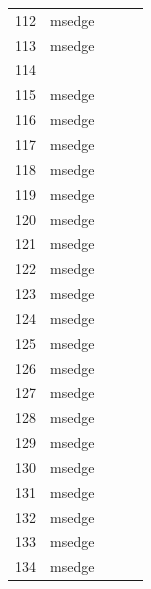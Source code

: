 \documentclass[a4paper,twoside,12pt]{book}
\begin{document}
\begin{appendices}
\begin{table}
\begin{tabular}{lllll}
	112 &         msedge &                &                &                \\
	113 &         msedge &                &                &                \\
	114 &                &                &                &                \\
	115 &         msedge &                &                &                \\
	116 &         msedge &                &                &                \\
	117 &         msedge &                &                &                \\
	118 &         msedge &                &                &                \\
	119 &         msedge &                &                &                \\
	120 &         msedge &                &                &                \\
	121 &         msedge &                &                &                \\
	122 &         msedge &                &                &                \\
	123 &         msedge &                &                &                \\
	124 &         msedge &                &                &                \\
	125 &         msedge &                &                &                \\
	126 &         msedge &                &                &                \\
	127 &         msedge &                &                &                \\
	128 &         msedge &                &                &                \\
	129 &         msedge &                &                &                \\
	130 &         msedge &                &                &                \\
	131 &         msedge &                &                &                \\
	132 &         msedge &                &                &                \\
	133 &         msedge &                &                &                \\
	134 &         msedge &                &                &                \\

\end{tabular}
\end{table}
\end{appendices}
\end{document}
